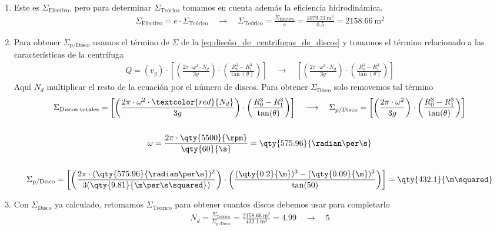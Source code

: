 {\begin{enumerate}
\begin{gather*}
            \end{gather*}
        \item Este es $\Sigma_{\text{Efectivo}}$, pero para determinar $\Sigma_{\text{Teórico}}$ tomamos en cuenta además la eficiencia hidrodinámica. \begin{gather*}
            \Sigma_{\text{Efectivo}} = e \cdot \Sigma_{\text{Teórico}}  \quad\longrightarrow\quad  \Sigma_{\text{Teórico}} = \frac{\Sigma_{\text{Efectivo}}}{e} = \frac{\qty{1079.33}{\m\squared}}{0.5} = \qty{2158.66}{\m\squared}
            \end{gather*}
        \item Para obtener $\Sigma_{\text{p/Disco}}$ usamos el término de $\Sigma$ de la \autoref{eq:diseño_de_centrifugas_de_discos} y tomamos el término relacionado a las características de la centrífuga \begin{gather*}
            Q=(v_{g})\cdot\left[\left(\frac{2\pi\cdot\omega^{2}\cdot N_{d}}{3g}\right)\cdot\left(\frac{R_{0}^{3}-R_{1}^{3}}{\tan(\theta)}\right)\right] \quad\longrightarrow\quad \left[\left(\frac{2\pi\cdot\omega^{2}\cdot N_{d}}{3g}\right)\cdot\left(\frac{R_{0}^{3}-R_{1}^{3}}{\tan(\theta)}\right)\right]
            \end{gather*}
            Aquí $N_{d}$ multiplicar el resto de la ecuación por el número de discos. Para obtener $\Sigma_{\text{Disco}}$ solo removemos tal término \begin{gather*}
            \Sigma_{\text{Discos totales}}=\left[\left(\frac{2\pi\cdot\omega^{2}\cdot\textcolor{red}{N_{d}}}{3g}\right)\cdot\left(\frac{R_{0}^{3}-R_{1}^{3}}{\tan(\theta)}\right)\right] \quad\longrightarrow\quad \Sigma_{\text{p/Disco}}=\left[\left(\frac{2\pi\cdot\omega^{2}}{3g}\right)\cdot\left(\frac{R_{0}^{3}-R_{1}^{3}}{\tan(\theta)}\right)\right]
            \\\\
            \omega = \frac{2\pi\cdot\qty{5500}{\rpm}}{\qty{60}{\s}} = \qty{575.96}{\radian\per\s}
            \\\\
            \Sigma_{\text{p/Disco}}=\left[\left(\frac{2\pi\cdot(\qty{575.96}{\radian\per\s})^{2}}{3(\qty{9.81}{\m\per\s\squared})}\right)\cdot\left(\frac{(\qty{0.2}{\m})^{3}-(\qty{0.09}{\m})^{3}}{\tan(50)} \right) \right] = \qty{432.1}{\m\squared}
            \end{gather*}
        \item Con $\Sigma_{\text{Disco}}$ ya calculado, retomamos $\Sigma_{\text{Teórico}}$ para obtener cuantos discos debemos usar para completarlo \begin{gather*}
            N_{d} = \frac{\Sigma_{\text{Teórico}}}{\Sigma_{\text{p/Disco}}} = \frac{\qty{2158.66}{\m\squared}}{\qty{432.1}{\m\squared}} =4.99 \quad\longrightarrow\quad 5
            \end{gather*}
    \end{enumerate}
}


